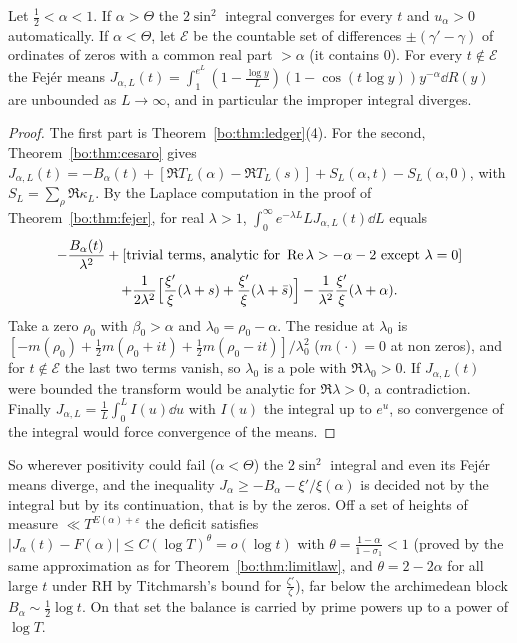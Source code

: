\begin{theorem}\label{bo:thm:dichotomy}
Let $\frac12<\alpha<1$. If $\alpha>\Theta$ the $2\sin^2$ integral converges for every $t$ and $u_\alpha>0$ automatically. If $\alpha<\Theta$, let $\mathcal E$ be the countable set of differences $\pm(\gamma'-\gamma)$ of ordinates of zeros with a common real part $>\alpha$ (it contains $0$). For every $t\notin\mathcal E$ the Fej\'er means $J_{\alpha,L}(t)=\int_1^{e^L}(1-\frac{\log y}L)(1-\cos(t\log y))y^{-\alpha}\dd R(y)$ are unbounded as $L\to\infty$, and in particular the improper integral diverges.
\end{theorem}

\begin{proof}
The first part is Theorem~\ref{bo:thm:ledger}(4). For the second, Theorem~\ref{bo:thm:cesaro} gives $J_{\alpha,L}(t)=-B_\alpha(t)+[\Re T_L(\alpha)-\Re T_L(s)]+S_L(\alpha,t)-S_L(\alpha,0)$, with $S_L=\sum_\rho\Re\kappa_L$. By the Laplace computation in the proof of Theorem~\ref{bo:thm:fejer}, for real $\lambda>1$, $\int_0^\infty e^{-\lambda L}LJ_{\alpha,L}(t)\dd L$ equals
\begin{multline*}
-\frac{B_\alpha(t)}{\lambda^2}+[\text{trivial terms, analytic for }\Re\lambda>-\alpha-2\text{ except }\lambda=0]\\+\frac1{2\lambda^2}\Bigl[\frac{\xi'}{\xi}(\lambda+s)+\frac{\xi'}{\xi}(\lambda+\bar s)\Bigr]-\frac1{\lambda^2}\frac{\xi'}{\xi}(\lambda+\alpha).
\end{multline*}
Take a zero $\rho_0$ with $\beta_0>\alpha$ and $\lambda_0=\rho_0-\alpha$. The residue at $\lambda_0$ is $[-m(\rho_0)+\frac12m(\rho_0+it)+\frac12m(\rho_0-it)]/\lambda_0^2$ ($m(\cdot)=0$ at non zeros), and for $t\notin\mathcal E$ the last two terms vanish, so $\lambda_0$ is a pole with $\Re\lambda_0>0$. If $J_{\alpha,L}(t)$ were bounded the transform would be analytic for $\Re\lambda>0$, a contradiction. Finally $J_{\alpha,L}=\frac1L\int_0^LI(u)\dd u$ with $I(u)$ the integral up to $e^u$, so convergence of the integral would force convergence of the means.
\end{proof}

So wherever positivity could fail ($\alpha<\Theta$) the $2\sin^2$ integral and even its Fej\'er means diverge, and the inequality $J_\alpha\ge-B_\alpha-\xi'/\xi(\alpha)$ is decided not by the integral but by its continuation, that is by the zeros. Off a set of heights of measure $\ll T^{E(\alpha)+\varepsilon}$ the deficit satisfies $|J_\alpha(t)-F(\alpha)|\le C(\log T)^{\theta}=o(\log t)$ with $\theta=\frac{1-\alpha}{1-\sigma_1}<1$ (proved by the same approximation as for Theorem~\ref{bo:thm:limitlaw}, and $\theta=2-2\alpha$ for all large $t$ under RH by Titchmarsh's bound for $\frac{\zeta'}{\zeta}$), far below the archimedean block $B_\alpha\sim\frac12\log t$. On that set the balance is carried by prime powers up to a power of $\log T$.

